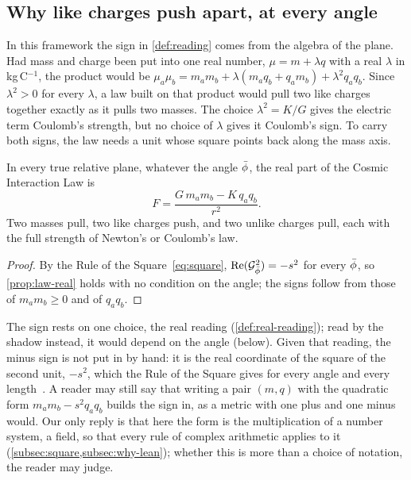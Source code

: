 \subsection{Why like charges push apart, at every angle}\label{subsec:why-sign}

In this framework the sign in \cref{def:reading} comes from the algebra of the plane. Had mass and charge been put into one real number, $\mu = m + \lambda q$ with a real $\lambda$ in kg\,C$^{-1}$, the product would be $\mu_a\mu_b = m_a m_b + \lambda(m_a q_b + q_a m_b) + \lambda^2 q_a q_b$. Since $\lambda^2 > 0$ for every $\lambda$, a law built on that product would pull two like charges together exactly as it pulls two masses. The choice $\lambda^2 = K/G$ gives the electric term Coulomb's strength, but no choice of $\lambda$ gives it Coulomb's sign. To carry both signs, the law needs a unit whose square points back along the mass axis.

\begin{proposition}\label{prop:sign}
In every true relative plane, whatever the angle $\bar{\phi}$, the real part of the Cosmic Interaction Law is
\[
F = \frac{G\,m_a m_b - K\,q_a q_b}{r^2} .
\]
Two masses pull, two like charges push, and two unlike charges pull, each with the full strength of Newton's or Coulomb's law.
\end{proposition}

\begin{proof}
By the Rule of the Square~\cref{eq:square}, $\operatorname{Re}(\mathcal{G}_{\bar{\phi}}^2) = -s^2$ for every $\bar{\phi}$, so \cref{prop:law-real} holds with no condition on the angle; the signs follow from those of $m_a m_b \ge 0$ and of $q_a q_b$.
\end{proof}

The sign rests on one choice, the real reading (\cref{def:real-reading}); read by the shadow instead, it would depend on the angle (below).
 Given that reading, the minus sign is not put in by hand: it is the real coordinate of the square of the second unit, $-s^2$, which the Rule of the Square gives for every angle and every length~\citep[Proposition~4.1]{DerrazGN2026}. A reader may still say that writing a pair $(m, q)$ with the quadratic form $m_a m_b - s^2 q_a q_b$ builds the sign in, as a metric with one plus and one minus would. Our only reply is that here the form is the multiplication of a number system, a field, so that every rule of complex arithmetic applies to it (\cref{subsec:square,subsec:why-lean}); whether this is more than a choice of notation, the reader may judge.

